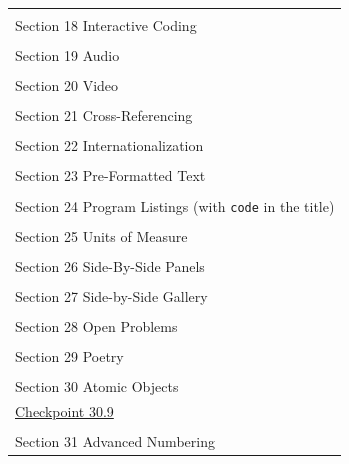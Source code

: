 \documentclass{sn-jnl}
\theoremstyle{thmstyleone}%
\theoremstyle{thmstyletwo}%
\theoremstyle{thmstylethree}%
\newcommand{\mono}[1]{\texttt{#1}}
\numberwithin{equation}{section}
\begin{document}
\begin{appendices}
\begin{longtable}[l]{ll}
\multicolumn{2}{l}{\null}\\[1.5ex] \multicolumn{2}{l}{\large Section 18 Interactive Coding}\\[0.5ex]
\multicolumn{2}{l}{\null}\\[1.5ex] \multicolumn{2}{l}{\large Section 19 Audio}\\[0.5ex]
\multicolumn{2}{l}{\null}\\[1.5ex] \multicolumn{2}{l}{\large Section 20 Video}\\[0.5ex]
\multicolumn{2}{l}{\null}\\[1.5ex] \multicolumn{2}{l}{\large Section 21 Cross-Referencing}\\[0.5ex]
\multicolumn{2}{l}{\null}\\[1.5ex] \multicolumn{2}{l}{\large Section 22 Internationalization}\\[0.5ex]
\multicolumn{2}{l}{\null}\\[1.5ex] \multicolumn{2}{l}{\large Section 23 Pre-Formatted Text}\\[0.5ex]
\multicolumn{2}{l}{\null}\\[1.5ex] \multicolumn{2}{l}{\large Section 24 Program Listings (with \mono{code} in the title)}\\[0.5ex]
\multicolumn{2}{l}{\null}\\[1.5ex] \multicolumn{2}{l}{\large Section 25 Units of Measure}\\[0.5ex]
\multicolumn{2}{l}{\null}\\[1.5ex] \multicolumn{2}{l}{\large Section 26 Side-By-Side Panels}\\[0.5ex]
\multicolumn{2}{l}{\null}\\[1.5ex] \multicolumn{2}{l}{\large Section 27 Side-by-Side Gallery}\\[0.5ex]
\multicolumn{2}{l}{\null}\\[1.5ex] \multicolumn{2}{l}{\large Section 28 Open Problems}\\[0.5ex]
\multicolumn{2}{l}{\null}\\[1.5ex] \multicolumn{2}{l}{\large Section 29 Poetry}\\[0.5ex]
\multicolumn{2}{l}{\null}\\[1.5ex] \multicolumn{2}{l}{\large Section 30 Atomic Objects}\\[0.5ex]
\hyperref[atomic-image-25]{Checkpoint 30.9}& \\
\multicolumn{2}{l}{\null}\\[1.5ex] \multicolumn{2}{l}{\large Section 31 Advanced Numbering}\\[0.5ex]

\end{longtable}
\end{appendices}
\end{document}
